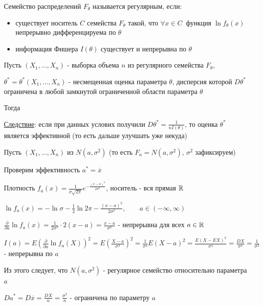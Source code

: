 \documentclass[12pt]{article}
\begin{document}
\Def Семейство распределений $F_\theta$ называется регулярным, если:

\begin{itemize}
    \item существует носитель $C$ семейства $F_\theta$ такой, что $\forall x \in C \ $ функция $\ln f_\theta(x)$ непрерывно дифференцируема по $\theta$
    \item информация Фишера $I(\theta)$ существует и непрерывна по $\theta$
\end{itemize}

\begin{MyTheorem}
    \Ths Пусть $(X_1, \dots, X_n)$ - выборка объема $n$ из регулярного семейства $F_\theta$,

    $\theta^* = \theta^*(X_1, \dots, X_n)$ - несмещенная оценка параметра $\theta$, дисперсия которой
    $D\theta^*$ ограничена в любой замкнутой ограниченной области параметра $\theta$

    Тогда 
\end{MyTheorem}

\underline{Следствие}: если при данных услових получили $D\theta^* = \frac{1}{n I(\theta)}$, то оценка $\theta^*$ является эффективной 
(то есть дальше улучшать уже некуда)

\Ex Пусть $(X_1, \dots, X_n)$ из $N(a, \sigma^2)$ (то есть $F_a = N(a, \sigma^2)$, $\sigma^2$ зафиксируем)

Проверим эффективность $a^* = \overline{x}$

Плотность $f_a(x) = \frac{1}{\sigma \sqrt{2\pi}} e^{-\frac{(x - a)^2}{2\sigma^2}}$, носитель - вся прямая $\mathbb{R}$

$\ln f_a(x) = -\ln \sigma - \frac{1}{2} \ln 2\pi - \frac{(x - a)^2}{2\sigma^2}, \quad\quad a \in (-\infty, \infty)$

$\frac{\partial}{\partial a} \ln f_a(x) = \frac{1}{2\sigma^2} \cdot 2(x - a) = \frac{x - a}{\sigma^2}$ - непрерывна для всех $a \in \mathbb{R}$

$I(a) = E\left(\frac{\partial}{\partial a} \ln f_a(X)\right)^2 = E\left(\frac{X - a}{\sigma^2}\right)^2 = \frac{1}{\sigma^4} E(X - a)^2 = \frac{E(X - EX)^2}{\sigma^4} = 
\frac{DX}{\sigma^4} = \frac{1}{\sigma^2}$ - непрерывна по $a$

Из этого следует, что $N(a, \sigma^2)$ - регулярное семейство относительно параметра $a$

$Da^* = D\overline{x} = \frac{DX}{n} = \frac{\sigma^2}{n}$ - ограничена по параметру $a$
\end{document}
